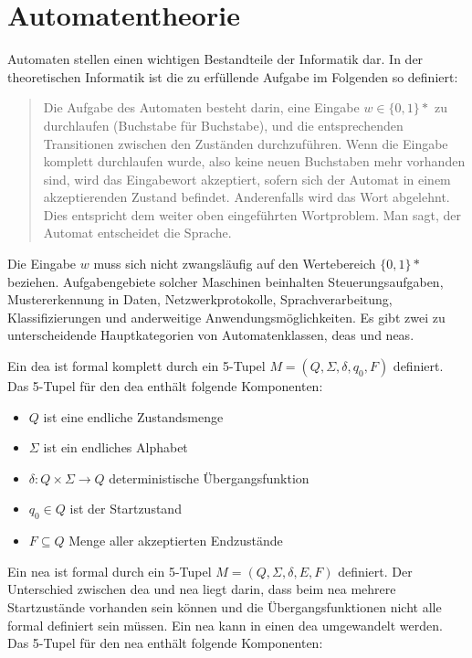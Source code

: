 \section{Automatentheorie}\label{automatatheory}
Automaten stellen einen wichtigen Bestandteile der Informatik dar. In der theoretischen Informatik ist die zu erfüllende Aufgabe im Folgenden so definiert:

\begin{itshape}
\begin{quote}
\glqq Die Aufgabe des Automaten besteht darin, eine Eingabe $w \in \{0, 1 \}\ast$ zu
durchlaufen (Buchstabe für Buchstabe), und die entsprechenden Transitionen
zwischen den Zuständen durchzuführen. Wenn die Eingabe komplett
durchlaufen wurde, also keine neuen Buchstaben mehr vorhanden sind, wird
das Eingabewort akzeptiert, sofern sich der Automat in einem akzeptierenden
Zustand befindet. Anderenfalls wird das Wort abgelehnt. Dies entspricht dem
weiter oben eingeführten Wortproblem. Man sagt, der Automat entscheidet
die Sprache.\grqq \cite{theororeticalinformatic}
\end{quote}
\end{itshape}

Die Eingabe $w$ muss sich nicht zwangsläufig auf den Wertebereich $\{0, 1 \}\ast$ beziehen. Aufgabengebiete solcher Maschinen beinhalten Steuerungsaufgaben, Mustererkennung in Daten, Netzwerkprotokolle, Sprachverarbeitung, Klassifizierungen und anderweitige Anwendungsmöglichkeiten. Es gibt zwei zu unterscheidende Hauptkategorien von Automatenklassen, \acp{dea} und \acp{nea}.

Ein \ac{dea} ist formal komplett durch ein 5-Tupel $M = (Q, \Sigma, \delta, q_0, F)$ definiert. Das 5-Tupel für den \ac{dea} enthält folgende Komponenten:

\begin{itemize}
  \setlength\itemsep{-0.6em}
\item $Q$  ist eine endliche Zustandsmenge
\item $\Sigma$ ist ein endliches Alphabet
\item $\delta:Q \times \Sigma \rightarrow Q$ deterministische Übergangsfunktion
\item $q_0 \in Q$ ist der Startzustand
\item $F \subseteq Q$ Menge aller akzeptierten Endzustände
\end{itemize}


Ein \ac{nea} ist formal durch ein 5-Tupel $M = (Q, \Sigma, \delta, E, F)$ definiert. Der Unterschied zwischen \ac{dea} und \ac{nea} liegt darin, dass beim \ac{nea} mehrere Startzustände vorhanden sein können und die Übergangsfunktionen nicht alle formal definiert sein müssen. Ein \ac{nea} kann in einen \ac{dea} umgewandelt werden. Das 5-Tupel für den \ac{nea} enthält folgende Komponenten:

